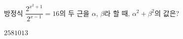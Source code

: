 방정식 $\dfrac{2^{x^2+1}}{2^{x-1}}=16$의 두 근을 $\alpha$, $\beta$라 할 때, $\alpha^2+\beta^2$의 값은?
\begin{choices32}{$2$}{$5$}{$8$}{$10$}{$13$}\end{choices32}
